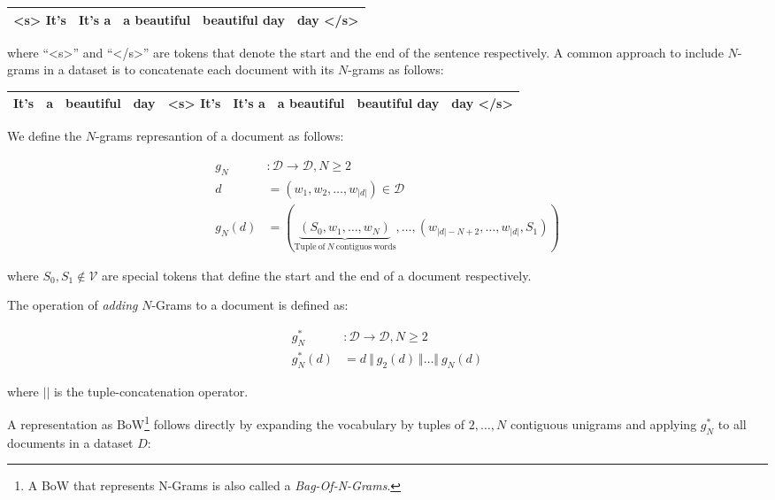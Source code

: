 \begin{center}
\begin{tabular}{|c|c|c|c|c|}
\hline 
<s> It's & It's a & a beautiful & beautiful day & day </s> \\
\hline
\end{tabular}
\end{center}

where ``<s>'' and ``</s>'' are tokens that denote the start and the end of the
sentence respectively. A common approach to include $N$-grams in a dataset is to
concatenate each document with its $N$-grams as follows: 

\begin{center}
\begin{tabular}{|c|c|c|c|c|c|c|c|c|}
\hline 
It's & a & beautiful & day & <s> It's & It's a & a beautiful & beautiful day &
 
day </s> \\
\hline
\end{tabular}
\end{center}

We define the $N$-grams represantion of a document as follows:

\begin{equation*}
\begin{split}
	g_N &:  \mathcal{D} \to \mathcal{D}, N \geq 2 \\
	d &= (w_1,w_2,\ldots,w_{|d|}) \in \mathcal{D} \\
	g_N(d) &=  (\underbrace{(S_0,w_1, \ldots,
	w_N)}_{\mathrm{Tuple~of}~N\mathrm{~contiguos~words}}, \ldots,
	(w_{|d|-N+2},\ldots,w_{|d|},S_1))
\end{split}
\end{equation*}

where $S_0, S_1 \not\in \mathcal{V}$ are special tokens that define the start
and the end of a document respectively.

The operation of \emph{adding} $N$-Grams to a document is defined as:

\begin{equation*}
\begin{split}
	g_N^* &: \mathcal{D} \to \mathcal{D}, N \geq 2 \\
	g_N^*(d) &= d~\Vert~g_2(d)~\Vert \ldots \Vert~g_N(d)
\end{split}
\end{equation*} 

where $||$ is the tuple-concatenation operator.

A representation as BoW\footnote{A BoW that represents N-Grams is also called a
\emph{Bag-Of-N-Grams}. } follows directly by expanding the vocabulary by tuples of
$2,\ldots,N$ contiguous unigrams and applying $g_N^*$ to all documents in a dataset $D$:

